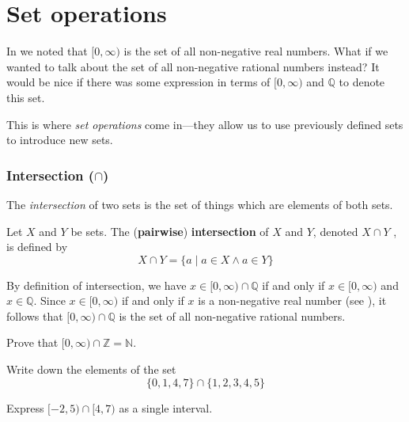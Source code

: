 \section{Set operations}

In  we noted that $[0,\infty)$ is the set of all non-negative real numbers. What if we wanted to talk about the set of all non-negative rational numbers instead? It would be nice if there was some expression in terms of $[0,\infty)$ and $\mathbb{Q}$ to denote this set.

This is where \textit{set operations} come in---they allow us to use previously defined sets to introduce new sets.

\subsubsection*{Intersection ($\cap$)}
The \textit{intersection} of two sets is the set of things which are elements of both sets.

\begin{definition}
Let $X$ and $Y$ be sets. The (\textbf{pairwise}) \textbf{intersection} of $X$ and $Y$, denoted $X \cap Y$ , is defined by
\[ X \cap Y = \{ a \mid a \in X \wedge a \in Y \} \]
\end{definition}

\begin{example}
By definition of intersection, we have $x \in [0,\infty) \cap \mathbb{Q}$ if and only if $x \in [0,\infty)$ and $x \in \mathbb{Q}$. Since $x \in [0,\infty)$ if and only if $x$ is a non-negative real number (see ), it follows that $[0,\infty) \cap \mathbb{Q}$ is the set of all non-negative rational numbers.
\end{example}

\begin{exercise}
Prove that $[0,\infty) \cap \mathbb{Z} = \mathbb{N}$.
\end{exercise}

\begin{exercise}
Write down the elements of the set
\[ \{ 0, 1, 4, 7 \} \cap \{ 1, 2, 3, 4, 5 \} \]
\end{exercise}

\begin{exercise}
Express $[-2,5) \cap [4,7)$ as a single interval.
\end{exercise}

